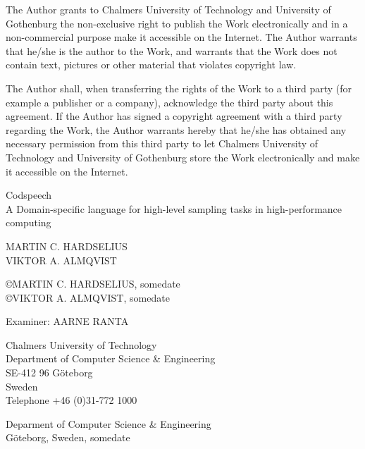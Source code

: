 \thispagestyle{empty}
The Author grants to Chalmers University of Technology and University
of Gothenburg the non-exclusive right to publish the Work
electronically and in a non-commercial purpose make it accessible on
the Internet.  The Author warrants that he/she is the author to the
Work, and warrants that the Work does not contain text, pictures or
other material that violates copyright law.

The Author shall, when transferring the rights of the Work to a third
party (for example a publisher or a company), acknowledge the third
party about this agreement. If the Author has signed a copyright
agreement with a third party regarding the Work, the Author warrants
hereby that he/she has obtained any necessary permission from this
third party to let Chalmers University of Technology and University of
Gothenburg store the Work electronically and make it accessible on the
Internet.

\vfill

\begin{flushleft}
Codspeech\\
A Domain-specific language for high-level sampling tasks in
high-performance computing
\vspace{11pt}

MARTIN C. HARDSELIUS\\
VIKTOR A. ALMQVIST
\vspace{11pt}

\copyright{MARTIN C. HARDSELIUS}, somedate \\
\copyright{VIKTOR A. ALMQVIST}, somedate
\vspace{11pt}

Examiner: {AARNE RANTA}
\vspace{11pt}

Chalmers University of Technology\\
Department of Computer Science \& Engineering\\
SE-412 96 Göteborg\\
Sweden\\
Telephone +46 (0)31-772 1000
\vspace{66pt}

Deparment of Computer Science \& Engineering\\
Göteborg, Sweden, somedate
\end{flushleft}
